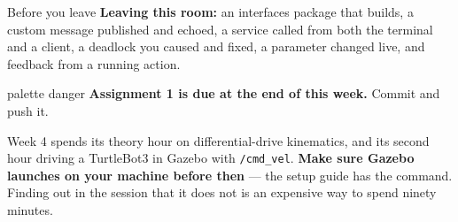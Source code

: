 \documentclass[aspectratio=169]{beamer}
\begin{document}
\begin{frame}{Before you leave}
  \small
  \textbf{Leaving this room:} an interfaces package that builds, a custom message published and
  echoed, a service called from both the terminal and a client, a deadlock you caused and
  fixed, a parameter changed live, and feedback from a running action.

  \vspace{0.7em}
  \begin{beamercolorbox}[sep=6pt,center,rounded=true]{palette danger}
    \small \textbf{Assignment 1 is due at the end of this week.} Commit and push it.
  \end{beamercolorbox}

  \vspace{0.7em}
  \begin{underhood}
    \footnotesize
    Week 4 spends its theory hour on differential-drive kinematics, and its second hour driving
    a TurtleBot3 in Gazebo with \texttt{/cmd\_vel}. \textbf{Make sure Gazebo launches on your
    machine before then} --- the setup guide has the command. Finding out in the session that
    it does not is an expensive way to spend ninety minutes.
  \end{underhood}
\end{frame}
\end{document}
